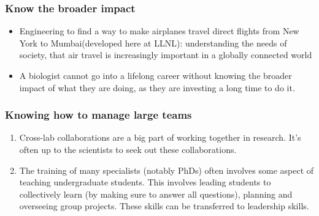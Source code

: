 \begin{frame}
\frametitle{Know the broader impact}
\begin{itemize}
\item Engineering to find a way to make airplanes travel direct flights from New York to Mumbai(developed here at LLNL): understanding the needs of society, that air travel is increasingly important in a globally connected world
\item A biologist cannot go into a lifelong career without knowing the broader impact of what they are doing, as they are investing a long time to do it.
\end{itemize}
\end{frame}


\begin{frame}
\frametitle{Knowing how to manage large teams}
\begin{enumerate}
\item Cross-lab collaborations are a big part of working together in
  research. It's often up to the scientists to seek out these collaborations.
\item The training of many specialists (notably PhDs) often involves some aspect of teaching undergraduate students. This involves leading students to collectively learn (by making sure to answer all questions), planning and overseeing group projects. These skills can be transferred to leadership skills.
\end{enumerate}
\end{frame}

